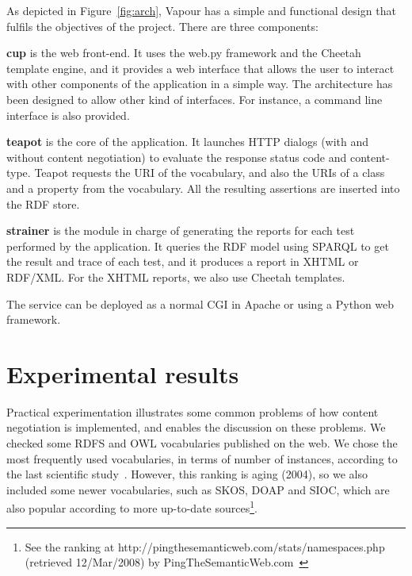\documentclass{../templates/llncs}
\begin{document}
As depicted in Figure~\ref{fig:arch}, Vapour has a simple and functional
design that fulfils the objectives of the project. There are three components:

\begin{description}

  \item \textbf{cup} is the web front-end. It uses the web.py framework
        and the Cheetah template engine, and it provides a web interface that allows 
        the user to interact with other components of the application in a 
        simple way. The architecture has been designed to allow other kind 
        of interfaces. For instance, a command line interface is also provided.

  \item \textbf{teapot} is the core of the application. It launches
        HTTP dialogs 
        (with and without content negotiation) to evaluate the response
        status code and content-type. Teapot requests the URI of the vocabulary, and 
        also the URIs of a class and a property from the vocabulary. All the resulting assertions are 
        inserted into the RDF store.

  \item \textbf{strainer} is the module in charge of generating the reports for
        each test performed by the application. It queries the RDF model using SPARQL %
        to get the result and trace of each test, and it produces 
        a report in XHTML or RDF/XML. For the XHTML reports, we also use Cheetah 
        templates.

\end{description}

The service can be deployed as a normal CGI in Apache or using a Python web 
framework. %

\section{\label{sec:experimental}Experimental results}

Practical experimentation illustrates some common problems of how
content negotiation is implemented, and enables the discussion on 
these problems. We checked some RDFS and OWL vocabularies published on the web.
We chose the most frequently used vocabularies, in terms of number of
instances, according to the last scientific study~\cite{Li2005}. However,
this ranking is aging (2004), so we also included some newer
vocabularies, such as SKOS, DOAP and SIOC, which are also popular
according to more up-to-date sources\footnote{See the ranking at http://pingthesemanticweb.com/stats/namespaces.php (retrieved 12/Mar/2008) by PingTheSemanticWeb.com~\cite{Bojars2007}}.
\end{document}
